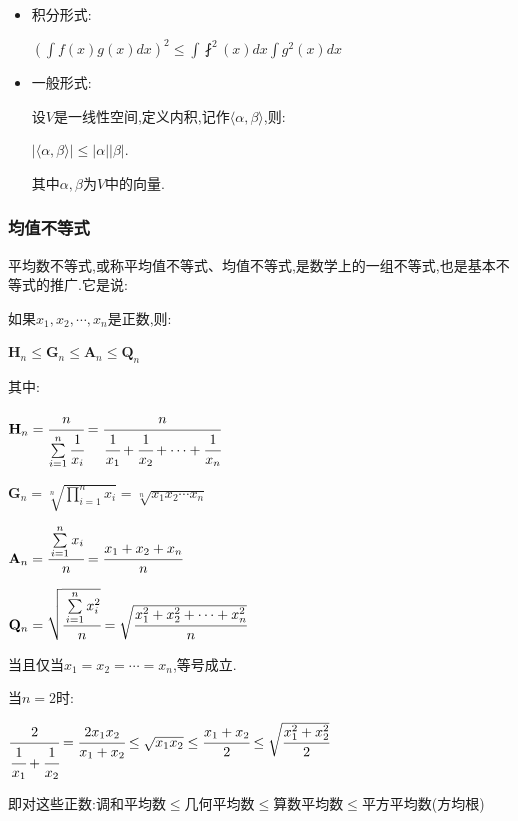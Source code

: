 \documentclass[UTF8,12pt]{ctexbook}
\newcommand{\upDownSum}[2]{\sum\limits_{#2}^{#1}}
\newcommand{\upDownProd}[2]{\prod\limits_{#2}^{#1}}
\newcommand{\defFunction}[1]{f(#1)}
\newcommand{\bigCase}[1]{\left(#1\right)}
\newcommand{\innerProduct}[2]{\langle#1,#2\rangle}
\begin{document}
{{{{\begin{itemize}
{          在三角形$ABC$中,这个式子可以写作:$||\vec{AB}|| + ||\vec{BC}|| \geq ||\vec{AC}||$

          也就是说:$\sqrt{a^2 + b^2} + \sqrt{c^2 + d^2} \geq \sqrt{(a - c)^2 + (b - d)^2}$

          等号成立的条件为:$ad = bc,且ac + bc \geq 0$(即$\cfrac{a}{c} = \cfrac{b}{d}$).
          }
    \item {
          积分形式:

          $\bigCase{\int\defFunction{x}g(x)dx}^2 \leq \int\fint^2(x)dx \int g^2(x)dx$
          }
    \item {
          一般形式:

          设$V$是一线性空间,定义内积,记作$\innerProduct{\alpha}{\beta}$,则:

          $|\innerProduct{\alpha}{\beta}| \leq |\alpha||\beta|$.

          其中$\alpha,\beta$为$V$中的向量.
          }
  \end{itemize}
}%

\subsubsection{均值不等式}{
平均数不等式,或称平均值不等式、均值不等式,是数学上的一组不等式,也是基本不等式的推广.它是说:

如果$x_{1},x_{2},\dotsm,x_{n}$是正数,则:

$\mathbf{H}_n \leq \mathbf{G}_n \leq \mathbf{A}_n \leq \mathbf{Q}_n$

其中:

$\mathbf{H}_n = \cfrac{n}{\upDownSum{n}{i = 1}\cfrac{1}{x_i}} = \cfrac{n}{\cfrac{1}{x_1} + \cfrac{1}{x_2} + \dotsm + \cfrac{1}{x_n}}$

$\mathbf{G}_n = \sqrt[n]{\upDownProd{n}{i = 1}x_i} = \sqrt[n]{x_1x_2\dotsm x_n}$

$\mathbf{A}_n = \cfrac{\upDownSum{n}{i = 1}x_i}{n} = \cfrac{x_1 + x_2 + x_n}{n}$

$\mathbf{Q}_n = \sqrt{\cfrac{\upDownSum{n}{i = 1}x^2_i}{n}} = \sqrt{\cfrac{x^2_1 + x^2_2 + \dotsm + x^2_n}{n}}$

当且仅当$x_1 = x_2 = \dotsm = x_n$,等号成立.

当$n = 2$时:

$\cfrac{2}{\cfrac{1}{x_1} + \cfrac{1}{x_2}} = \cfrac{2x_1x_2}{x_1 + x_2}\leq\sqrt{x_1x_2}\leq\cfrac{x_1 + x_2}{2}\leq\sqrt{\cfrac{x_1^2 + x_2^2}{2}}$

即对这些正数:调和平均数$\leq$几何平均数$\leq$算数平均数$\leq$平方平均数(方均根)

}}}}
\end{document}
